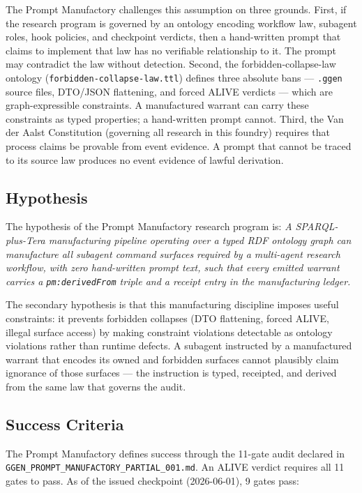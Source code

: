 The Prompt Manufactory challenges this assumption on three grounds. First, if the research
program is governed by an ontology encoding workflow law, subagent roles, hook policies,
and checkpoint verdicts, then a hand-written prompt that claims to implement that law has
no verifiable relationship to it. The prompt may contradict the law without detection.
Second, the forbidden-collapse-law ontology (\texttt{forbidden-collapse-law.ttl}) defines
three absolute bans --- \texttt{.ggen} source files, DTO/JSON flattening, and forced ALIVE
verdicts --- which are graph-expressible constraints. A manufactured warrant can carry these
constraints as typed properties; a hand-written prompt cannot. Third, the Van der Aalst
Constitution (governing all research in this foundry) requires that process claims be
provable from event evidence. A prompt that cannot be traced to its source law produces no
event evidence of lawful derivation.

\subsection{Hypothesis}
\label{sec:research-prompt-manufactory-question-hypothesis}

The hypothesis of the Prompt Manufactory research program is: \textit{A SPARQL-plus-Tera
manufacturing pipeline operating over a typed RDF ontology graph can manufacture all
subagent command surfaces required by a multi-agent research workflow, with zero
hand-written prompt text, such that every emitted warrant carries a
\texttt{pm:derivedFrom} triple and a receipt entry in the manufacturing ledger.}

The secondary hypothesis is that this manufacturing discipline imposes useful
constraints: it prevents forbidden collapses (DTO flattening, forced ALIVE, illegal
surface access) by making constraint violations detectable as ontology violations rather
than runtime defects. A subagent instructed by a manufactured warrant that encodes its
owned and forbidden surfaces cannot plausibly claim ignorance of those surfaces --- the
instruction is typed, receipted, and derived from the same law that governs the audit.

\subsection{Success Criteria}
\label{sec:research-prompt-manufactory-question-success}

The Prompt Manufactory defines success through the 11-gate audit declared in
\texttt{GGEN\_PROMPT\_MANUFACTORY\_PARTIAL\_001.md}. An ALIVE verdict requires all 11 gates
to pass. As of the issued checkpoint (2026-06-01), 9 gates pass:

